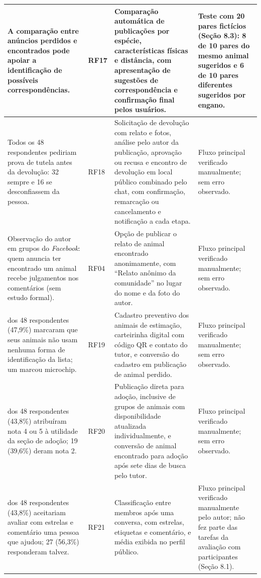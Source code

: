 {\begin{longtable}{|>{\raggedright\arraybackslash}p{4.1cm}|>{\centering\arraybackslash}p{1.8cm}|>{\raggedright\arraybackslash}p{5.4cm}|>{\raggedright\arraybackslash}p{2.7cm}|}
A comparação entre anúncios perdidos e encontrados pode apoiar a identificação de possíveis correspondências. & RF17 & Comparação automática de publicações por espécie, características físicas e distância, com apresentação de sugestões de correspondência e confirmação final pelos usuários. & Teste com 20 pares fictícios (Seção 8.3): 8 de 10 pares do mesmo animal sugeridos e 6 de 10 pares diferentes sugeridos por engano. \\ \hline
Todos os 48 respondentes pediriam prova de tutela antes da devolução: 32 sempre e 16 se desconfiassem da pessoa. & RF18 & Solicitação de devolução com relato e fotos, análise pelo autor da publicação, aprovação ou recusa e encontro de devolução em local público combinado pelo chat, com confirmação, remarcação ou cancelamento e notificação a cada etapa. & Fluxo principal verificado manualmente; sem erro observado. \\ \hline
Observação do autor em grupos do \textit{Facebook}: quem anuncia ter encontrado um animal recebe julgamentos nos comentários (sem estudo formal). & RF04 & Opção de publicar o relato de animal encontrado anonimamente, com ``Relato anônimo da comunidade'' no lugar do nome e da foto do autor. & Fluxo principal verificado manualmente; sem erro observado. \\ \hline
23 dos 48 respondentes (47,9\%) marcaram que seus animais não usam nenhuma forma de identificação da lista; um marcou microchip. & RF19 & Cadastro preventivo dos animais de estimação, carteirinha digital com código QR e contato do tutor, e conversão do cadastro em publicação de animal perdido. & Fluxo principal verificado manualmente; sem erro observado. \\ \hline
21 dos 48 respondentes (43,8\%) atribuíram nota 4 ou 5 à utilidade da seção de adoção; 19 (39,6\%) deram nota 2. & RF20 & Publicação direta para adoção, inclusive de grupos de animais com disponibilidade atualizada individualmente, e conversão de animal encontrado para adoção após sete dias de busca pelo tutor. & Fluxo principal verificado manualmente; sem erro observado. \\ \hline
21 dos 48 respondentes (43,8\%) aceitariam avaliar com estrelas e comentário uma pessoa que ajudou; 27 (56,3\%) responderam talvez. & RF21 & Classificação entre membros após uma conversa, com estrelas, etiquetas e comentário, e média exibida no perfil público. & Fluxo principal verificado manualmente pelo autor; não fez parte das tarefas da avaliação com participantes (Seção 8.1). \\ \hline
\end{longtable}
}
\clearpage

